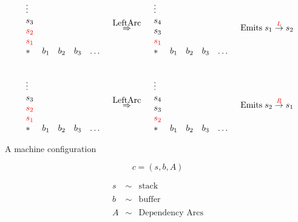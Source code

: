 {$$\begin{array}{llll}
    \begin{array}{lllll}
      \vdots \\
      s_3 \\
    {\color{red} s_2} \\
    {\color{red} s_1} \\
    * & b_1 & b_2 & b_3 & \ldots
  \end{array}
  &
  \stackrel{\mbox{LeftArc}}{\Rightarrow}
  &
  \begin{array}{lllll}
    \vdots \\
    s_4 \\
    s_3 \\
    {\color{red} s_1} \\
    * & b_1 & b_2 & b_3 & \ldots
  \end{array}
  &
  \mbox{Emits} \;s_1 \stackrel{{\color{red} L}}{\rightarrow} s_2 \\
  \\
  \\
    \begin{array}{lllll}
      \vdots \\
      s_3 \\
    {\color{red} s_2} \\
    {\color{red} s_1} \\
    * & b_1 & b_2 & b_3 & \ldots
  \end{array}
  &
  \stackrel{\mbox{LeftArc}}{\Rightarrow}
  &
  \begin{array}{lllll}
    \vdots \\
    s_4 \\
    s_3 \\
    {\color{red} s_2} \\
    * & b_1 & b_2 & b_3 & \ldots
  \end{array}
  &
  \mbox{Emits} \;s_2 \stackrel{{\color{red} R}}{\rightarrow} s_1 \\
\end{array}
$$


A machine configuration

$$c = (s,b,A)$$

\begin{eqnarray*}
  s & \sim & \mbox{stack} \\
  \\
  b & \sim & \mbox{buffer} \\
  \\
  A & \sim & \mbox{Dependency Arcs}
\end{eqnarray*}

}
